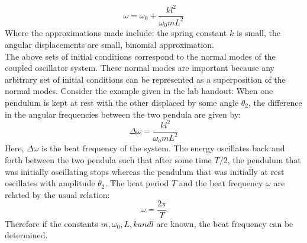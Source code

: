 \documentclass[main.tex]{subfiles}
\begin{document}
\begin{equation}
\omega = \omega_0 + \frac{kl^2}{\omega_0 mL^2}
\end{equation}
Where the approximations made include: the spring constant $k$ is small, the angular displacements are small, binomial approximation.
\\
The above sets of initial conditions correspond to the normal modes of the coupled oscillator system. These normal modes are important because any arbitrary set of initial conditions can be represented as a superposition of the normal modes. Consider the example given in the lab handout: When one pendulum is kept at rest with the other displaced by some angle $\theta_2$, the difference in the angular frequencies between the two pendula are given by:
\begin{equation}
\Delta\omega = \frac{kl^2}{\omega_o mL^2}
\end{equation}
Here, $\Delta\omega$ is the beat frequency of the system. The energy oscillates back and forth between the two pendula such that after some time $T/2$, the pendulum that was initially oscillating stops whereas the pendulum that was initially at rest oscillates with amplitude $\theta_2$. The beat period $T$ and the beat frequency $\omega$ are related by the usual relation:
\begin{equation}
\omega = \frac{2\pi}{T}
\end{equation}
Therefore if the constants $m, \omega_0, L, k and l$ are known, the beat frequency can be determined.
\end{document}
